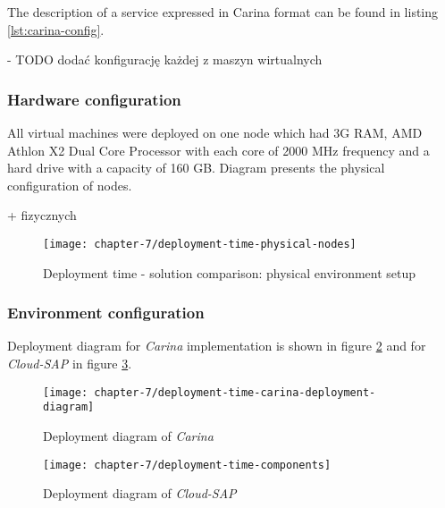 The description of a service expressed in Carina format can be found in listing \ref{lst:carina-config}.

- TODO dodać konfigurację każdej z maszyn wirtualnych 

\subsubsection{Hardware configuration}
All virtual machines were deployed on one node which had 3G RAM, AMD Athlon X2 Dual Core Processor with each core of 2000 MHz frequency and a hard drive with a capacity of 160 GB. Diagram presents the physical configuration of nodes.

+ fizycznych

\begin{figure}[!ht]
  \begin{center}
    \texttt{[image: chapter-7/deployment-time-physical-nodes]}
  \end{center}
  \caption{Deployment time - solution comparison: physical environment setup}
  \label{eval:deployment-time-physical-nodes}
\end{figure}

\subsubsection{Environment configuration}
Deployment diagram for \emph{Carina} implementation is shown in figure \ref{ch7:deployment-time-test-deployment-time-carina-deployment-diagram} and for \emph{Cloud-SAP} in figure \ref{ch7:deployment-time-test-deployment-time-components}.

\begin{figure}[!ht]
  \begin{center}
    \texttt{[image: chapter-7/deployment-time-carina-deployment-diagram]}
  \end{center}
  \caption{Deployment diagram of \emph{Carina}}
  \label{ch7:deployment-time-test-deployment-time-carina-deployment-diagram}
\end{figure}

\begin{figure}[!ht]
  \begin{center}
    \texttt{[image: chapter-7/deployment-time-components]}
  \end{center}
  \caption{Deployment diagram of \emph{Cloud-SAP}}
  \label{ch7:deployment-time-test-deployment-time-components}
\end{figure}

